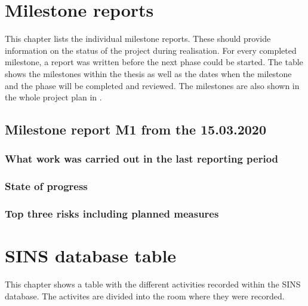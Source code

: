 \chapter{Milestone reports}
\label{app:Milestone-Reports}
This chapter lists the individual milestone reports. These should provide information on the status of the project during realisation. For every completed milestone, a report was written before the next phase could be started. The table  shows the milestones within the thesis as well as the dates when the milestone and the phase will be completed and reviewed. The milestones are also shown in the whole project plan in .

\section{Milestone report M1 from the 15.03.2020}

\subsection{What work was carried out in the last reporting period}

\subsection{State of progress}

\subsection{Top three risks including planned measures}

\chapter{SINS database table}
\label{app:SINS-Databse-Table}
This chapter shows a table with the different activities recorded within the SINS database. The activites are divided into the room where they were recorded.

